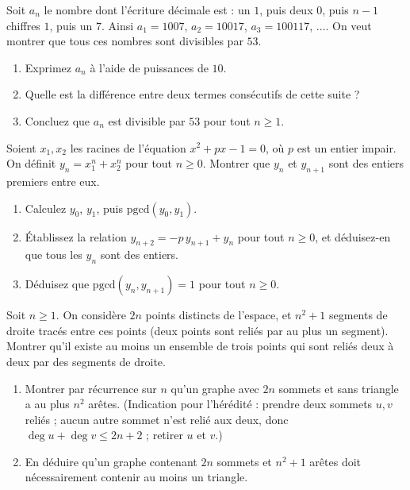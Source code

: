 \begin{exercise}
    Soit \(a_n\) le nombre dont l'écriture décimale est : un \(1\), puis deux \(0\), puis \(n-1\) chiffres \(1\), puis un \(7\). Ainsi \(a_1 = 1007\), \(a_2 = 10017\), \(a_3 = 100117\), \(\dots\). On veut montrer que tous ces nombres sont divisibles par \(53\).

    \begin{enumerate}
        \item Exprimez \(a_n\) à l'aide de puissances de \(10\).
        \item Quelle est la différence entre deux termes consécutifs de cette suite ?
        \item Concluez que \(a_n\) est divisible par \(53\) pour tout \(n \geq 1\).
    \end{enumerate}
\end{exercise}

\begin{exercise}
    Soient \(x_1, x_2\) les racines de l'équation \(x^2 + px - 1 = 0\), où \(p\) est un entier impair.
    On définit \(y_n = x_1^n + x_2^n\) pour tout \(n \geq 0\).
    Montrer que \(y_n\) et \(y_{n+1}\) sont des entiers premiers entre eux.

    \begin{enumerate}
        \item Calculez $y_0$, $y_1$, puis $\mathrm{pgcd}(y_0,y_1)$.
        \item Établissez la relation $y_{n+2} = -p \, y_{n+1} + y_n$ pour tout $n \geq 0$, et déduisez-en que tous les $y_n$ sont des entiers.
        \item Déduisez que \(\mathrm{pgcd}(y_n, y_{n+1}) = 1\) pour tout \(n \geq 0\).
    \end{enumerate}
\end{exercise}

\begin{exercise}
    Soit \(n \geq 1\). On considère \(2n\) points distincts de l'espace, et \(n^2 + 1\) segments de droite tracés entre ces points (deux points sont reliés par au plus un segment). Montrer qu'il existe au moins un ensemble de trois points qui sont reliés deux à deux par des segments de droite.

    \begin{enumerate}
        \item Montrer par récurrence sur \(n\) qu'un graphe avec \(2n\) sommets et sans triangle a au plus \(n^2\) arêtes. (Indication pour l'hérédité : prendre deux sommets \(u, v\) reliés ; aucun autre sommet n'est relié aux deux, donc \(\deg u + \deg v \leq 2n+2\) ; retirer \(u\) et \(v\).)
        \item En déduire qu'un graphe contenant \(2n\) sommets et \(n^2 + 1\) arêtes doit nécessairement contenir au moins un triangle.
    \end{enumerate}
\end{exercise}



